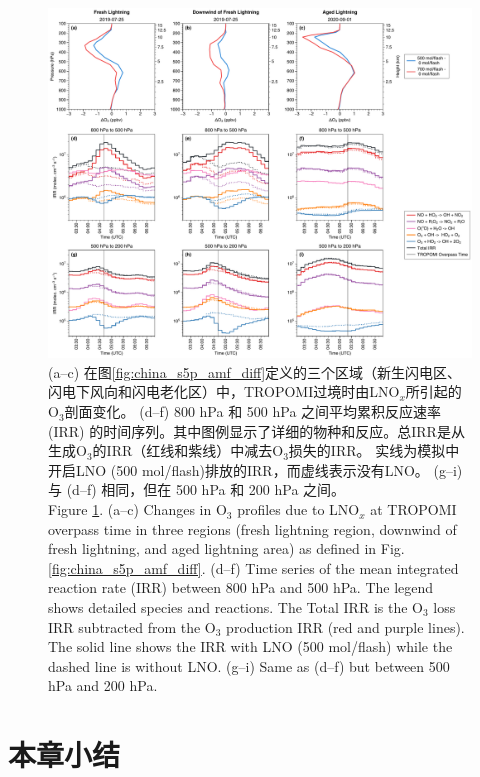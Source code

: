 \begin{figure}[h]
    \includegraphics[width=16cm]{./figures/irr_timeseries.pdf}
    \caption{
    (a--c) 在图\ref{fig:china_s5p_amf_diff}定义的三个区域（新生闪电区、闪电下风向和闪电老化区）中，TROPOMI过境时由LNO$_x$所引起的O$_3$剖面变化。
    (d--f) 800 hPa 和 500 hPa 之间平均累积反应速率 (IRR) 的时间序列。其中图例显示了详细的物种和反应。总IRR是从生成O$_3$的IRR（红线和紫线）中减去O$_3$损失的IRR。
     实线为模拟中开启LNO (500 mol/flash)排放的IRR，而虚线表示没有LNO。
    (g--i) 与 (d--f) 相同，但在 500 hPa 和 200 hPa 之间。\\
    Figure \ref{fig:irr_timeseries}. (a--c) Changes in O$_3$ profiles due to LNO$_x$ at TROPOMI overpass time in three regions (fresh lightning region, downwind of fresh lightning, and aged lightning area) as defined in Fig. \ref{fig:china_s5p_amf_diff}.
    (d--f) Time series of the mean integrated reaction rate (IRR) between 800 hPa and 500 hPa.
    The legend shows detailed species and reactions.
    The Total IRR is the O$_3$ loss IRR subtracted from the O$_3$ production IRR (red and purple lines).
    The solid line shows the IRR with LNO (500 mol/flash) while the dashed line is without LNO.
    (g--i) Same as (d--f) but between 500 hPa and 200 hPa.
    }
    \label{fig:irr_timeseries}
\end{figure}

\section{本章小结}


